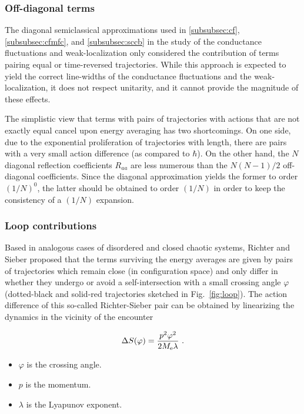 \documentclass[a4paper,10pt]{article}
\newcommand{\nin}{\noindent}
\def\Me{M_{\rm e}}
\newcommand{\be}{\begin{equation}}
\newcommand{\ee}{\end{equation}}
\begin{document}
\subsubsection{Off-diagonal terms}
\label{subsubsec:odt}

The diagonal semiclassical approximations used in \ref{subsubsec:cf}, \ref{subsubsec:cfmfc}, and \ref{subsubsec:sccb} in the study of the conductance fluctuations and weak-localization only considered the contribution of terms pairing equal or time-reversed trajectories. While this approach is expected to yield the correct line-widths of the conductance fluctuations and the weak-localization, it does not respect unitarity, and it cannot provide the magnitude of these effects. 

\nin The simplistic view that terms with pairs of trajectories with actions that are not exactly equal cancel upon energy averaging has two shortcomings. On one side, due to the exponential proliferation of trajectories with length, there are pairs with a very small action difference \cite{Argaman} (as compared to $\hbar$). On the other hand, the $N$ diagonal reflection coefficients $R_{aa}$ are less numerous than the $N(N-1)/2$ off-diagonal coefficients. Since the diagonal approximation yields the former to order $(1/N)^0$, the latter should be obtained to order $(1/N)$ in order to keep the consistency of a $(1/N)$ expansion. 

\subsubsection{Loop contributions}
\label{subsubsec:loopcon}

Based in analogous cases of disordered \cite{AkkerMonta} and closed chaotic \cite{Sieber2001,Sieber2002} systems, Richter and Sieber \cite{Richter2002} proposed that the terms surviving the energy averages are given by pairs of trajectories which remain close (in configuration space) and only differ in whether they undergo or avoid a self-intersection with a small crossing angle $\varphi$ (dotted-black and solid-red trajectories sketched in Fig.~\ref{fig:loop}). The action difference of this so-called Richter-Sieber pair can be obtained by linearizing the dynamics in the vicinity of the encounter \cite{Sieber2002}

\be
\Delta S(\varphi)= \frac{p^2 \varphi^2}{2\Me \lambda} \ .
\label{deltaSRSp}
\ee

\begin{itemize}

\item $\varphi$ is the crossing angle.  

\item $p$ is the momentum.

\item $\lambda$ is the Lyapunov exponent.  

\end{itemize} 
\end{document}
